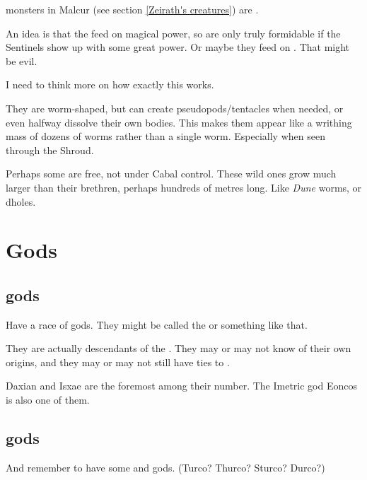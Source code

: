 \Zeirathz{} monsters in Malcur (see section \ref{Zeirath's creatures}) are \ghobaleth. 

An idea is that the \ghobaleth{} feed on magical power, so \Zeirathz{} \ghobaleth{} are only truly formidable if the Sentinels show up with some great power. Or maybe they feed on \vertices. That might be evil. 

I need to think more on how exactly this works. 

They are worm-shaped, but can create pseudopods/tentacles when needed, or even halfway dissolve their own bodies. This makes them appear like a writhing mass of dozens of worms rather than a single worm. Especially when seen through the Shroud. 

Perhaps some \ghobaleth{} are free, not under Cabal control. These wild ones grow much larger than their  brethren, perhaps hundreds of metres long. Like \emph{Dune} worms, or dholes. 















\section{Gods}
\subsection{\Human{} gods}
Have a race of \human{} gods. They might be called the  or something like that. 

They are actually descendants of the \Kezeradi. They may or may not know of their own origins, and they may or may not still have ties to \Kezerad. 

Daxian and Isxae are the foremost among their number. The Imetric god Eoncos is also one of them. 







\subsection{\Scathaese{} gods}
And remember to have some \Ortaican{} and \Shurco{} gods. (Turco? Thurco? Sturco? Durco?)















